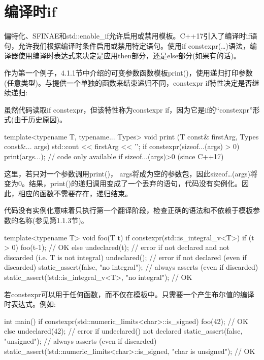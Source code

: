\section{编译时if}
偏特化、SFINAE和std::enable\_if允许启用或禁用模板。C++17引入了编译时if语句，允许我们根据编译时条件启用或禁用特定语句。使用if constexpr(…)语法，编译器使用编译时表达式来决定是应用then部分，还是else部分(如果有的话)。

作为第一个例子，4.1.1节中介绍的可变参数函数模板print()，使用递归打印参数(任意类型)。与提供一个单独的函数来结束递归不同，constexpr if特性决定是否继续递归:

\begin{notice}
虽然代码读取if constexpr，但该特性称为constexpr if，因为它是if的“constexpr”形式(由于历史原因)。
\end{notice}

\begin{cpp}
template<typename T, typename... Types>
void print (T const& firstArg, Types const&... args)
{
	std::cout << firstArg << '\n';
	if constexpr(sizeof...(args) > 0) {
		print(args...); // code only available if sizeof...(args)>0 (since C++17)
	}
}
\end{cpp}

这里，若只对一个参数调用print()， args将成为空的参数包，因此sizeof…(args)将变为0。结果，print()的递归调用变成了一个丢弃的语句，代码没有实例化。因此，相应的函数不需要存在，递归结束。

代码没有实例化意味着只执行第一个翻译阶段，检查正确的语法和不依赖于模板参数的名称(参见第1.1.3节)。

\begin{cpp}
template<typename T>
void foo(T t)
{
	if constexpr(std::is_integral_v<T>) {
		if (t > 0) {
			foo(t-1); // OK
		}
	}
	else {
		undeclared(t); // error if not declared and not discarded (i.e. T is not integral)
		undeclared(); // error if not declared (even if discarded)
		static_assert(false, "no integral"); // always asserts (even if discarded)
		static_assert(!std::is_integral_v<T>, "no integral"); // OK
	}
}
\end{cpp}

若constexpr可以用于任何函数，而不仅在模板中。只需要一个产生布尔值的编译时表达式。例如:

\begin{cpp}
int main()
{
	if constexpr(std::numeric_limits<char>::is_signed) {
		foo(42); // OK
	}
	else {
		undeclared(42); // error if undeclared() not declared
		static_assert(false, "unsigned"); // always asserts (even if discarded)
		static_assert(!std::numeric_limits<char>::is_signed,
		"char is unsigned"); // OK
	}
}
\end{cpp}

